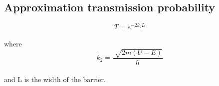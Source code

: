 \documentclass{article}
\begin{document}
\subsection*{Approximation transmission probability}
\begin{equation}
    T=e^{-2k_2 L}
\end{equation}
\\
where
\begin{equation}
    k_2=\frac{\sqrt[]{2m(U-E)}}{\hbar}
\end{equation}
\\
and L is the width of the barrier.
\end{document}
